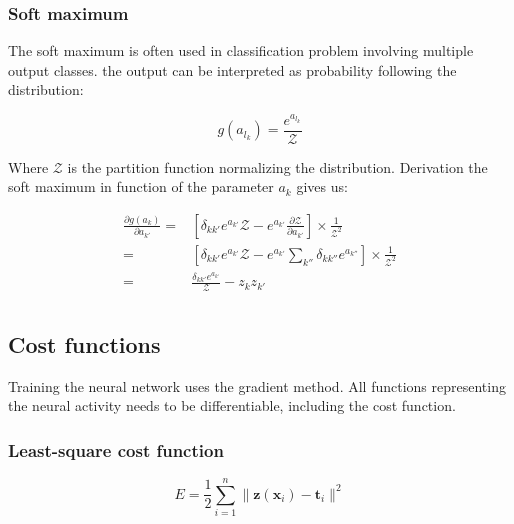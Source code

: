 \documentclass[final, paper=letter,5p,times,twocolumn]{elsarticle}
\begin{document}
\subsubsection{Soft maximum}
\label{soft_max_sec}

The soft maximum is often used in classification problem involving multiple output classes. the output can be interpreted as probability following the distribution:

\begin{equation}
  g(a_{l_{k}}) = \frac{e^{a_{l_{k}}}}{\mathcal{Z}}
  \label{soft_max}
\end{equation}

Where $\mathcal{Z}$ is the partition function normalizing the distribution. Derivation the soft maximum in function of the parameter $a_{k}$ gives us:

\begin{equation*}
  \begin{split}
    \frac{\partial g(a_{k})}{\partial a_{k'}} = & \left \lbrack \delta_{kk'} e^{a_{k'}} \mathcal{Z} - e^{a_{k'}}\frac{\partial \mathcal{Z}}{\partial a_{k'}} \right \rbrack \times \frac{1}{\mathcal{Z}^{2}}\\
    = & \left \lbrack \delta_{kk'} e^{a_{k'}} \mathcal{Z} - e^{a_{k'}} \sum_{k''} \delta_{kk''} e^{a_{k''}}  \right \rbrack \times \frac{1}{\mathcal{Z}^{2}}\\
    = & \frac{\delta_{kk'} e^{a_{k'}}}{\mathcal{Z}} - z_{k}z_{k'}\\
  \end{split}
\end{equation*}

\lipsum[2-2]

\subsection{Cost functions}

Training the neural network uses the gradient method. All functions representing the neural activity needs to be differentiable, including the cost function. \lipsum[3-3]

\subsubsection{Least-square cost function}

\begin{equation}
  E = \frac{1}{2} \sum_{i = 1}^{n} \| \bm{z}(\bm{x}_{i}) - \bm{t}_{i} \|^{2}
  \label{least_squarre}
\end{equation}
\end{document}
